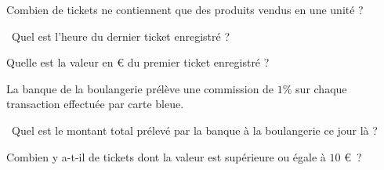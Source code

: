 \medskip{}

\question{} Combien de tickets ne contiennent que des produits vendus en une unité ? 

\medskip{}

\question{} Quel est l'heure du dernier ticket enregistré ? 

\medskip{}

\question{} Quelle est la valeur en € du premier ticket enregistré ? 

\medskip{}

La banque de la boulangerie prélève une commission de $1\%$ sur chaque transaction effectuée par carte bleue. 

\question{} Quel est le montant total prélevé par la banque à la boulangerie ce jour là ? 

\medskip{}

\question{} Combien y a-t-il de tickets dont la valeur est supérieure ou égale à $10$ € ? 
